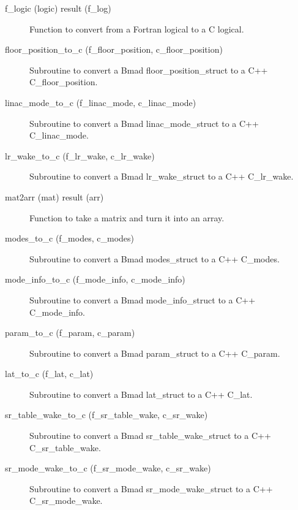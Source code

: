\begin{description}
\label{r:f.logic}
\item[f_logic (logic) result (f_log)] \Newline 
Function to convert from a Fortran logical to a C logical.

\label{r:floor.position.to.c}
\item[floor_position_to_c (f_floor_position, c_floor_position)] \Newline 
Subroutine to convert a Bmad floor_position_struct to a C++ C_floor_position.

\label{r:linac.mode.to.c}
\item[linac_mode_to_c (f_linac_mode, c_linac_mode)] \Newline 
Subroutine to convert a Bmad linac_mode_struct to a C++ C_linac_mode.

\label{r:lr.wake.to.c}
\item[lr_wake_to_c (f_lr_wake, c_lr_wake)] \Newline 
Subroutine to convert a Bmad lr_wake_struct to a C++ C_lr_wake.

\label{r:mat2arr}
\item[mat2arr (mat) result (arr)] \Newline 
Function to take a matrix and turn it into an array.

\label{r:modes.to.c}
\item[modes_to_c (f_modes, c_modes)] \Newline 
Subroutine to convert a Bmad modes_struct to a C++ C_modes.

\label{r:mode.info.to.c}
\item[mode_info_to_c (f_mode_info, c_mode_info)] \Newline 
Subroutine to convert a Bmad mode_info_struct to a C++ C_mode_info.

\label{r:param.to.c}
\item[param_to_c (f_param, c_param)] \Newline 
Subroutine to convert a Bmad param_struct to a C++ C_param.

\label{r:lat.to.c}
\item[lat_to_c (f_lat, c_lat)] \Newline 
Subroutine to convert a Bmad lat_struct to a C++ C_lat.

\label{r:sr.table.wake.to.c}
\item[sr_table_wake_to_c (f_sr_table_wake, c_sr_wake)] \Newline 
Subroutine to convert a Bmad sr_table_wake_struct to a C++ C_sr_table_wake.

\label{r:sr.mode.wake.to.c}
\item[sr_mode_wake_to_c (f_sr_mode_wake, c_sr_wake)] \Newline 
Subroutine to convert a Bmad sr_mode_wake_struct to a C++ C_sr_mode_wake.


\end{description}
